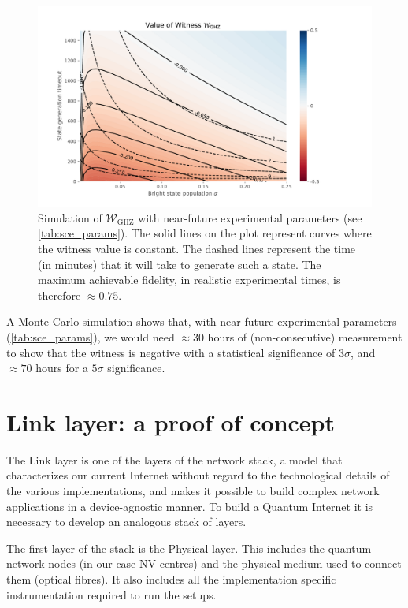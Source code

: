 \documentclass[a4paper]{article}
\begin{document}
\begin{figure}
	\includegraphics[width=\textwidth, trim=1cm 1cm 3cm 1cm 0cm]{../images/witness.pdf}
	\caption{Simulation of $\mathcal W_\text{GHZ}$ with near-future experimental parameters (see \autoref{tab:sce_params}). The solid lines on the plot represent curves where the witness value is constant. The dashed lines represent the time (in minutes) that it will take to generate such a state. The maximum achievable fidelity, in realistic experimental times, is therefore $\approx 0.75$.}
	\label{fig:witness}
\end{figure}

A Monte-Carlo simulation shows that, with near future experimental parameters (\autoref{tab:sce_params}), we would need $\approx 30$ hours of (non-consecutive) measurement to show that the witness is negative with a statistical significance of $3\sigma$, and $\approx 70$ hours for a $5\sigma$ significance.

\section{Link layer: a proof of concept}
\label{sec:link}

The Link layer is one of the layers of the network stack, a model that characterizes our current Internet without regard to the technological details of the various implementations, and makes it possible to build complex network applications in a device-agnostic manner. To build a Quantum Internet it is necessary to develop an analogous stack of layers.

The first layer of the stack is the Physical layer. This includes the quantum network nodes (in our case \ac{NV} centres) and the physical medium used to connect them (optical fibres). It also includes all the implementation specific instrumentation required to run the setups.
\end{document}
